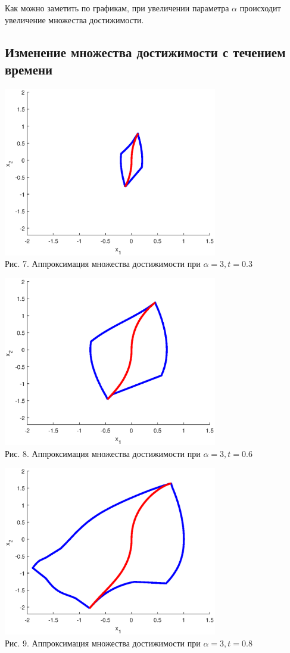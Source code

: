 \documentclass{article}
\theoremstyle{definition}
\begin{document}
	{Как можно заметить по графикам, при увеличении параметра $\alpha$ происходит увеличение множества достижимости.}
	\newpage
	{\subsection{Изменение множества достижимости с течением времени}}
	\begin{center}
		\includegraphics[width=0.7\textwidth]{texample1.eps}\\
		{Рис. 7. Аппроксимация множества достижимости при $\alpha = 3, t = 0.3$ }
	\end{center}
	\begin{center}
		\includegraphics[width=0.7\textwidth]{texample2.eps}\\
		{Рис. 8. Аппроксимация множества достижимости при $\alpha = 3, t = 0.6$ }
	\end{center}
	\begin{center}
		\includegraphics[width=0.7\textwidth]{texample3.eps}\\
		{Рис. 9. Аппроксимация множества достижимости при $\alpha = 3, t = 0.8$ }
	\end{center}
\end{document}
